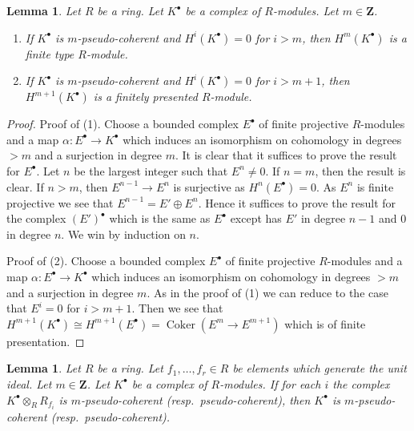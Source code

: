 \documentclass{amsart}
\theoremstyle{plain}
\newtheorem{lemma}[subsection]{Lemma}
\theoremstyle{definition}
\theoremstyle{remark}
\numberwithin{equation}{subsection}
\def\Coker{\mathop{\mathrm{Coker}}}
\begin{document}
\begin{lemma}
\label{more-algebra-lemma-finite-cohomology}
Let $R$ be a ring. Let $K^\bullet$ be a complex of $R$-modules.
Let $m \in \mathbf{Z}$.
\begin{enumerate}
\item If $K^\bullet$ is $m$-pseudo-coherent and $H^i(K^\bullet) = 0$
for $i > m$, then $H^m(K^\bullet)$ is a finite type $R$-module.
\item If $K^\bullet$ is $m$-pseudo-coherent and $H^i(K^\bullet) = 0$
for $i > m + 1$, then $H^{m + 1}(K^\bullet)$ is a finitely presented
$R$-module.
\end{enumerate}
\end{lemma}

\begin{proof}
Proof of (1). Choose a bounded complex $E^\bullet$ of finite projective
$R$-modules and a map $\alpha : E^\bullet \to K^\bullet$ which induces
an isomorphism on cohomology in degrees $> m$ and a surjection in degree $m$.
It is clear that it suffices to prove the result for $E^\bullet$.
Let $n$ be the largest integer such that $E^n \not = 0$.
If $n = m$, then the result is clear.
If $n > m$, then $E^{n - 1} \to E^n$ is surjective as
$H^n(E^\bullet) = 0$. As $E^n$ is finite projective we see that
$E^{n - 1} = E' \oplus E^n$. Hence it suffices to prove the result
for the complex $(E')^\bullet$ which is the same as $E^\bullet$
except has $E'$ in degree $n - 1$ and $0$ in degree $n$.
We win by induction on $n$.

\medskip\noindent
Proof of (2). Choose a bounded complex $E^\bullet$ of finite projective
$R$-modules and a map $\alpha : E^\bullet \to K^\bullet$ which induces
an isomorphism on cohomology in degrees $> m$ and a surjection in degree $m$.
As in the proof of (1) we can reduce to the case that $E^i = 0$ for
$i > m + 1$. Then we see that
$H^{m + 1}(K^\bullet) \cong
H^{m + 1}(E^\bullet) = \Coker(E^m \to E^{m + 1})$
which is of finite presentation.
\end{proof}


\begin{lemma}
\label{more-algebra-lemma-glue-pseudo-coherent}
Let $R$ be a ring. Let $f_1, \ldots, f_r \in R$ be elements which
generate the unit ideal. Let $m \in \mathbf{Z}$. Let $K^\bullet$
be a complex of $R$-modules. If for each $i$ the complex
$K^\bullet \otimes_R R_{f_i}$ is $m$-pseudo-coherent
(resp.\ pseudo-coherent), then $K^\bullet$ is $m$-pseudo-coherent
(resp.\ pseudo-coherent).
\end{lemma}
\end{document}
